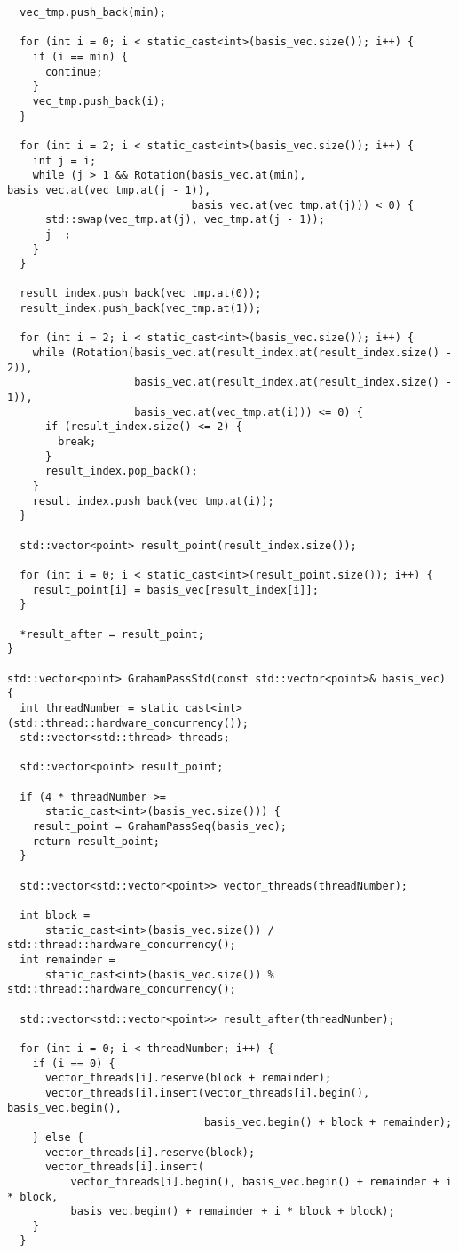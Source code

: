 \documentclass{report}
\begin{document}
\begin{lstlisting}
  vec_tmp.push_back(min);

  for (int i = 0; i < static_cast<int>(basis_vec.size()); i++) {
    if (i == min) {
      continue;
    }
    vec_tmp.push_back(i);
  }

  for (int i = 2; i < static_cast<int>(basis_vec.size()); i++) {
    int j = i;
    while (j > 1 && Rotation(basis_vec.at(min), basis_vec.at(vec_tmp.at(j - 1)),
                             basis_vec.at(vec_tmp.at(j))) < 0) {
      std::swap(vec_tmp.at(j), vec_tmp.at(j - 1));
      j--;
    }
  }

  result_index.push_back(vec_tmp.at(0));
  result_index.push_back(vec_tmp.at(1));

  for (int i = 2; i < static_cast<int>(basis_vec.size()); i++) {
    while (Rotation(basis_vec.at(result_index.at(result_index.size() - 2)),
                    basis_vec.at(result_index.at(result_index.size() - 1)),
                    basis_vec.at(vec_tmp.at(i))) <= 0) {
      if (result_index.size() <= 2) {
        break;
      }
      result_index.pop_back();
    }
    result_index.push_back(vec_tmp.at(i));
  }

  std::vector<point> result_point(result_index.size());

  for (int i = 0; i < static_cast<int>(result_point.size()); i++) {
    result_point[i] = basis_vec[result_index[i]];
  }

  *result_after = result_point;
}

std::vector<point> GrahamPassStd(const std::vector<point>& basis_vec) {
  int threadNumber = static_cast<int>(std::thread::hardware_concurrency());
  std::vector<std::thread> threads;

  std::vector<point> result_point;

  if (4 * threadNumber >=
      static_cast<int>(basis_vec.size())) {
    result_point = GrahamPassSeq(basis_vec);
    return result_point;
  }

  std::vector<std::vector<point>> vector_threads(threadNumber);

  int block =
      static_cast<int>(basis_vec.size()) / std::thread::hardware_concurrency();
  int remainder =
      static_cast<int>(basis_vec.size()) % std::thread::hardware_concurrency();

  std::vector<std::vector<point>> result_after(threadNumber);

  for (int i = 0; i < threadNumber; i++) {
    if (i == 0) {
      vector_threads[i].reserve(block + remainder);
      vector_threads[i].insert(vector_threads[i].begin(), basis_vec.begin(),
                               basis_vec.begin() + block + remainder);
    } else {
      vector_threads[i].reserve(block);
      vector_threads[i].insert(
          vector_threads[i].begin(), basis_vec.begin() + remainder + i * block,
          basis_vec.begin() + remainder + i * block + block);
    }
  }


\end{lstlisting}
\end{document}
